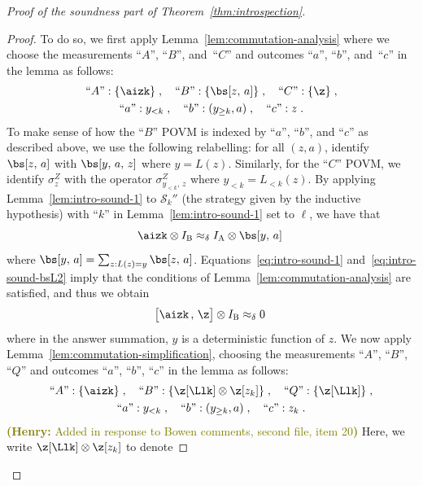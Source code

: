 \documentclass[11pt]{article}
\theoremstyle{definition}
\newcommand{\Id}{\ensuremath{I}}
\newcommand{\ia}{\Id_\alice}
\newcommand{\ib}{\Id_\bob}
\newcommand{\strategy}{\mathscr{S}}
\newcommand{\labelstyle}[1]{\ensuremath{\textsc{#1}}\xspace}
\newcommand{\alice}{\labelstyle{A}}
\newcommand{\bob}{\labelstyle{B}}
\newcommand{\hnote}[1]{\textcolor{olive}{\small {\textbf{(Henry:} #1\textbf{) }}}}
\newcommand{\hnote}[1]{}
\begin{document}
\begin{proof}[Proof of the soundness part of Theorem~\ref{thm:introspection}]
\begin{proof}
    To do so, we first apply Lemma~\ref{lem:commutation-analysis} where we
    choose the measurements ``$A$'', ``$B$'', and~``$C$'' and outcomes ``$a$'',
    ``$b$'', and~``$c$'' in the lemma as follows:
    \begin{gather*}
      \text{``$A$''}: \{\aizk\}\;,\quad
      \text{``$B$''}: \{\bs[z, \, a]\}\;,\quad
      \text{``$C$''}: \{\z  \}\;, \\
      \text{``$a$''}: y_{< k} \;, \quad
      \text{``$b$''}: (y_{\geq k},a) \;, \quad
      \text{``$c$''}: z \;.
    \end{gather*}
    To make sense of how the ``$B$'' POVM is indexed by ``$a$'', ``$b$'', and
    ``$c$'' as described above, we use the following relabelling: for all
    $(z,a)$, identify $\bs[z,\, a]$ with $\bs[y,\, a,\, z]$ where $y =
    L(z)$.
    Similarly, for the ``$C$'' POVM, we identify $\sigma^Z_z$ with the operator
    $\sigma^Z_{y_{<k},\, z}$ where $y_{<k} = L_{<k}(z)$.
    By applying Lemma~\ref{lem:intro-sound-1} to $\strategy_k''$ (the strategy
    given by the inductive hypothesis) with ``$k$'' in
    Lemma~\ref{lem:intro-sound-1} set to $\ell$, we have that
    \begin{equation}
      \label{eq:intro-sound-bsL2}
      \aizk \otimes \ib \approx_\delta \ia \otimes \bs[y,\, a]\;
    \end{equation}
    where $\bs[y,\, a] = \sum_{z: L(z) = y} \bs[z,\, a]$.
    Equations~\eqref{eq:intro-sound-1} and~\eqref{eq:intro-sound-bsL2} imply that the
    conditions of Lemma~\ref{lem:commutation-analysis} are satisfied, and thus
    we obtain
    \begin{equation}\label{eq:commute-with-Z}
      \bigl[\aizk \,,\, \z \bigr] \otimes \ib \approx_\delta 0\;
    \end{equation}
    where in the answer summation, $y$ is a deterministic function of $z$.
    We now apply Lemma~\ref{lem:commutation-simplification}, choosing the
    measurements ``$A$'', ``$B$'', ``$Q$'' and outcomes ``$a$'', ``$b$'',
    ``$c$'' in the lemma as follows:
    \begin{gather*}
      \text{``$A$''}: \{\aizk\}\;,\quad
      \text{``$B$''}: \{\z[\Llk] \otimes \z[z_k] \}\;, \quad
      \text{``$Q$''}: \{\z[\Llk] \}\;, \\
      \text{``$a$''}: y_{< k} \;, \quad
      \text{``$b$''}: (y_{\geq k}, a) \;, \quad
      \text{``$c$''}: z_k \;.
    \end{gather*}
    \hnote{Added in response to Bowen comments, second file, item 20} Here, we write $\z[\Llk] \otimes \z[z_k]$ to denote

\end{proof}
\end{proof}
\end{document}
